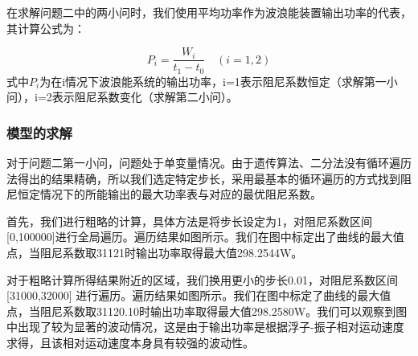 \documentclass[12pt,utf8]{article}
\begin{document}
在求解问题二中的两小问时，我们使用平均功率作为波浪能装置输出功率的代表，其计算公式为：

\begin{equation}
	P_i = \frac{W_i}{t_1-t_0}\quad (i={1,2})
\end{equation}
式中$P_i$为在i情况下波浪能系统的输出功率，i=1表示阻尼系数恒定（求解第一小问），i=2表示阻尼系数变化（求解第二小问）。

\subsubsection{模型的求解}

对于问题二第一小问，问题处于单变量情况。由于遗传算法、二分法没有循环遍历法得出的结果精确，所以我们选定特定步长，采用最基本的循环遍历的方式找到阻尼恒定情况下的所能输出的最大功率表与对应的最优阻尼系数。

首先，我们进行粗略的计算，具体方法是将步长设定为1，对阻尼系数区间 [0,100000]进行全局遍历。遍历结果如图所示。我们在图中标定出了曲线的最大值点，当阻尼系数取31121时输出功率取得最大值298.2544W。


对于粗略计算所得结果附近的区域，我们换用更小的步长0.01，对阻尼系数区间[31000,32000] 进行遍历。遍历结果如图所示。我们在图中标定了曲线的最大值点，当阻尼系数取31120.10时输出功率取得最大值298.2580W。我们可以观察到图中出现了较为显著的波动情况，这是由于输出功率是根据浮子-振子相对运动速度求得，且该相对运动速度本身具有较强的波动性。
\end{document}
